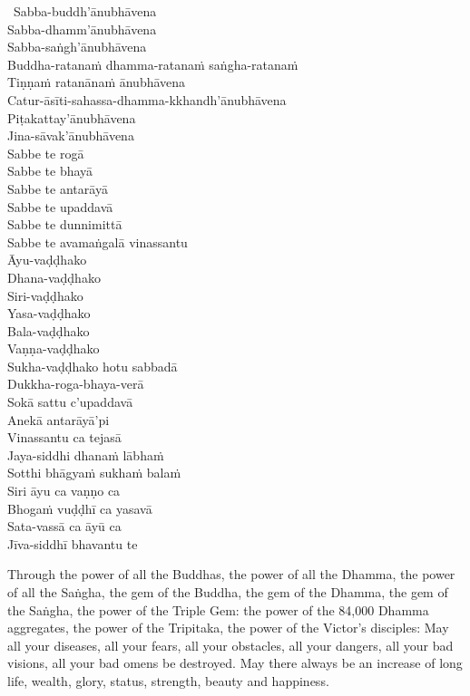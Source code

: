 \begin{pali-hangtogether}
  \anglebracketleft\ \hspace{-0.5mm}Sabba-buddh'ānubhāvena \hspace{-0.5mm}\anglebracketright\ \\
  Sabba-dhamm'ānubhāvena\\
  Sabba-saṅgh'ānubhāvena\\
  Buddha-ratanaṁ dhamma-ratanaṁ saṅgha-ratanaṁ\\
  Tiṇṇaṁ ratanānaṁ ānubhāvena\\
  Catur-āsīti-sahassa-dhamma-kkhandh'ānubhāvena\\
  Piṭakattay'ānubhāvena\\
  Jina-sāvak'ānubhāvena\\
  Sabbe te rogā\\
  Sabbe te bhayā\\
  Sabbe te antarāyā\\
  Sabbe te upaddavā\\
  Sabbe te dunnimittā\\
  Sabbe te avamaṅgalā vinassantu\\
  Āyu-vaḍḍhako\\
  Dhana-vaḍḍhako\\
  Siri-vaḍḍhako\\
  Yasa-vaḍḍhako\\
  Bala-vaḍḍhako\\
  Vaṇṇa-vaḍḍhako\\
  Sukha-vaḍḍhako hotu sabbadā\\
  Dukkha-roga-bhaya-verā\\
  Sokā sattu c'upaddavā\\
  Anekā antarāyā'pi\\
  Vinassantu ca tejasā\\
  Jaya-siddhi dhanaṁ lābhaṁ\\
  Sotthi bhāgyaṁ sukhaṁ balaṁ\\
  Siri āyu ca vaṇṇo ca\\
  Bhogaṁ vuḍḍhī ca yasavā\\
  Sata-vassā ca āyū ca\\
  Jīva-siddhī bhavantu te
\end{pali-hangtogether}

\begin{english-verses}
  Through the power of all the Buddhas, the power of all the Dhamma, the power of all the Saṅgha, the gem of the Buddha, the gem of the Dhamma, the gem of the Saṅgha, the power of the Triple Gem: the power of the 84,000 Dhamma aggregates, the power of the Tripitaka, the power of the Victor's disciples: May all your diseases, all your fears, all your obstacles, all your dangers, all your bad visions, all your bad omens be destroyed. May there always be an increase of long life, wealth, glory, status, strength, beauty and happiness.
\end{english-verses}

